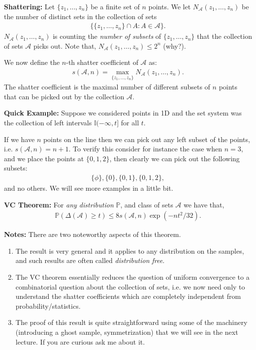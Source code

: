 \documentclass[twoside,12pt]{article}
\begin{document}
{\bf Shattering: } Let $\{z_1,\ldots,z_n\}$ be a finite set of $n$ points. We let $N_{\mathcal{A}}(z_1,\ldots,z_n)$ be the number of distinct sets in the collection of sets
\begin{align*}
\{ \{z_1,\ldots,z_n\} \cap A: A \in \mathcal{A} \}.
\end{align*}
$N_{\mathcal{A}}(z_1,\ldots,z_n)$ is counting the \emph{number of subsets} of $\{z_1,\ldots,z_n\}$ 
that the collection of sets $\mathcal{A}$ picks out. Note that, $N_{\mathcal{A}}(z_1,\ldots,z_n) \leq 2^n$ (why?).

We now define the $n$-th shatter coefficient of $\mathcal{A}$ as:
\begin{align*}
s(\mathcal{A},n) = \max_{\{z_1,\ldots,z_n\}} N_{\mathcal{A}}(z_1,\ldots,z_n).
\end{align*}
The shatter coefficient is the maximal number of different subsets of $n$ points that can be picked out by the collection $\mathcal{A}$.

{\bf Quick Example: } Suppose we considered points in 1D and the set system was the collection of left intervals $\mathbb{I}(-\infty,t]$ for all $t$.

If we have $n$ points on the line then we can pick out any left subset of the points, i.e. $s(\mathcal{A},n) = n+1$. To verify this consider for instance the case when $n = 3$, and we place the points at $\{0, 1, 2\}$, then clearly we can pick out the following subsets:
\begin{align*}
\{\phi\}, \{0\}, \{0,1\}, \{0,1,2\},
\end{align*}
and no others.
We will see more examples in a little bit.

{\bf VC Theorem: } For \emph{any distribution} $\mathbb{P}$, and class of sets $\mathcal{A}$ we have that,
\begin{align*}
\mathbb{P}( \Delta(\mathcal{A}) \geq t) \leq 8 s(\mathcal{A},n) \exp (- n t^2/32).
\end{align*}



{\bf Notes: } There are two noteworthy aspects of this theorem. 
\begin{enumerate}
\item The result is very general and it applies to any distribution on the samples, and such results are often called \emph{distribution free}. 

\item The VC theorem essentially reduces the question of uniform convergence to a combinatorial question about the collection of sets, i.e. we now need only to understand the shatter coefficients which are completely independent from probability/statistics. 

\item The proof of this result is quite straightforward using some of the machinery (introducing a ghost sample, symmetrization) that we will see in the next lecture. If you are curious ask me about it.
\end{enumerate}
\end{document}
